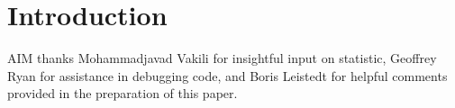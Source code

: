 \documentclass[preprint]{aastex}
\begin{document}
\begin{abstract}

\end{abstract}


\section{Introduction}

\citep{placeholder}

\label{sec:intro}


\begin{acknowledgements}
AIM thanks Mohammadjavad Vakili for insightful input on statistic, Geoffrey Ryan for assistance in debugging code, and Boris Leistedt for helpful comments provided in the preparation of this paper.
\end{acknowledgements}



\end{document}

